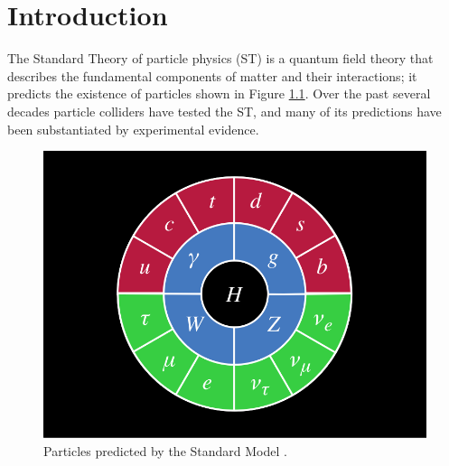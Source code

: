 \chapter{Introduction}
\label{intro_chapter}

The Standard Theory of particle physics (ST) \cite{weinbergSM,salamSM} 
is a quantum field theory that describes the fundamental components of matter and their interactions; 
it predicts the existence of particles shown in Figure \ref{fig:structureOfSM}.  Over the past several 
decades particle colliders have tested the ST, and many of its predictions have been substantiated by 
experimental evidence.

\begin{figure}[h]
	\centering
	\includegraphics[width=1.0\textwidth]{figures/SM_particles_circularRep.png}
	\caption{Particles predicted by the Standard Model \cite{smParticles}.}
	\label{fig:structureOfSM}
\end{figure}

